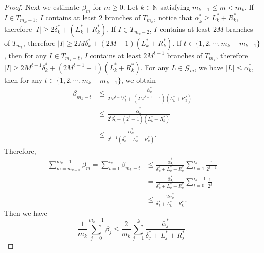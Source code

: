 \documentclass[10pt,a4paper]{amsart}
\begin{document}
\begin{proof}
Next we estimate  $\beta_m$ for $m\ge0$. Let $k\in \mathbb{N} $ satisfying $m_{k-1}\le m < m_k$.
If $I\in T_{m_{k}-1}$, $I$ contains at least $2$ branches of $T_{m_k}$, notice that $\underline{\alpha}^*_k\ge L^*_k+R^*_k $,  therefore $\left | I \right | \ge 2\delta^*_k+(L^*_k+R^*_k)$.
If $I\in T_{m_{k}-2}$, $I$ contains at least $2M$ branches of $T_{m_k}$, therefore $\left | I \right | \ge 2M\delta^*_k+(2M-1)(L^*_k+R^*_k)$.
If $t\in \{1,2, \cdots, m_k-m_{k-1}\}$, then for any $I \in T_{m_k-t}$, $I$ contains at least $2M^{t-1}$ branches of $T_{m_k}$, therefore $\left | I \right | \ge 2M^{t-1}\delta^*_k+(2M^{t-1}-1)(L^*_k+R^*_k)$.
For any $L\in \mathcal{G}_m$, we have $\left | L \right | \le \bar{\alpha}^*_k,$
then for any $t\in \{1,2, \cdots, m_k-m_{k-1}\}$, we obtain
\begin{equation}
\begin{aligned}
\beta_{m_k-t}&\le \frac{\bar{\alpha}^*_k}{2M^{t-1}\delta^*_k+(2M^{t-1}-1)(L^*_k+R^*_k)}\\
&\le \frac{\bar{\alpha}^*_k}{2^{t}\delta^*_k+(2^{t}-1)(L^*_k+R^*_k)}\\
&\le \frac{\bar{\alpha}^*_k}{2^{t-1}(\delta^*_k+L^*_k+R^*_k)}.
\end{aligned}
\end{equation}
Therefore,
\begin{equation}\label{xxxx}
\begin{aligned}
\sum_{m = m_{k-1}}^{m_k-1} \beta_{m} = \sum_{t  = 1}^{i_k} \beta_{m_k-t}&\le\frac{\bar{\alpha}^*_k}{\delta^*_k+L^*_k+R^*_k}\sum_{t = 1}^{i_k}\frac{1}{2^{t-1}} \\
 &=\frac{\bar{\alpha}^*_k}{\delta^*_k+L^*_k+R^*_k}\sum_{t =0}^{i_k-1}\frac{1}{2^{t}}\\
&\le \frac{2\bar{\alpha}^*_k}{\delta^*_k+L^*_k+R^*_k}.
\end{aligned}
\end{equation}
Then we have
\begin{equation}\label{xs}
\frac{1}{m_k} \sum_{j=0}^{m_k-1} \beta_{j} \le \frac{2}{m_k}\sum_{j=1}^{k} \frac{\bar{\alpha}^*_j}{\delta^*_j+L^*_j+R^*_j}.
\end{equation}


\end{proof}
\end{document}
